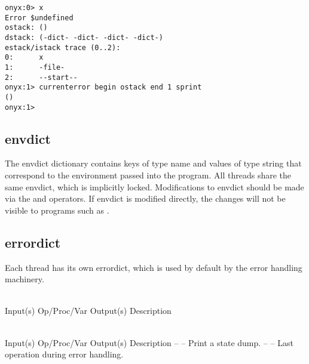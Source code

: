 \begin{description}
\begin{description}
\begin{verbatim}
onyx:0> x
Error $undefined
ostack: ()
dstack: (-dict- -dict- -dict- -dict-)
estack/istack trace (0..2):
0:      x
1:      -file-
2:      --start--
onyx:1> currenterror begin ostack end 1 sprint
()
onyx:1>
		\end{verbatim}
	\end{description}
\end{description}

\subsection{envdict}
\label{sec:envdict}

The envdict dictionary contains keys of type name and values of type string that
correspond to the environment passed into the program.  All threads share the
same envdict, which is implicitly locked.  Modifications to envdict should be
made via the  and
 operators.  If envdict is
modified directly, the changes will not be visible to programs such as
.

\subsection{errordict}
\label{sec:errordict}

Each thread has its own errordict, which is used by default by the error
handling machinery.

\begin{longtable}{}
\caption{errordict summary} \\
\hline
\optableent
	{Input(s)}
	{Op/Proc/Var}
	{Output(s)}
	{Description}
\hline \hline
\endfirsthead
\caption[]{\emph{continued}} \\
\hline
\optableent
	{Input(s)}
	{Op/Proc/Var}
	{Output(s)}
	{Description}
\hline \hline \endhead
{} \endfoot
\hline \endlastfoot
\optableent
	{--}
	{{\bf {}}}
	{--}
	{Print a state dump.}
\hline
\optableent
	{--}
	{{\bf {}}}
	{--}
	{Last operation during error handling.}
\end{longtable}

